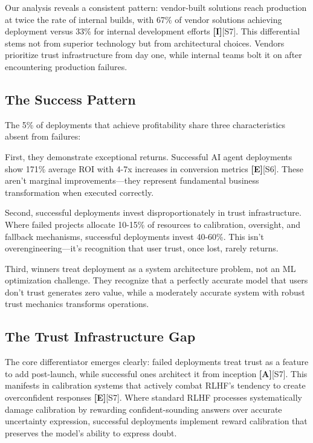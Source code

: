\documentclass[a4paper,11pt]{article}
\newcommand{\elabel}{\textbf{\textcolor{ecolor}{[E]}}}
\newcommand{\ilabel}{\textbf{\textcolor{icolor}{[I]}}}
\newcommand{\alabel}{\textbf{\textcolor{acolor}{[A]}}}
\begin{document}
Our analysis reveals a consistent pattern: vendor-built solutions reach production at twice the rate of internal builds, with 67\% of vendor solutions achieving deployment versus 33\% for internal development efforts \ilabel{}\textcolor{primary}{[S7]}. This differential stems not from superior technology but from architectural choices. Vendors prioritize trust infrastructure from day one, while internal teams bolt it on after encountering production failures.


\subsection{The Success Pattern}

The 5\% of deployments that achieve profitability share three characteristics absent from failures:


First, they demonstrate exceptional returns. Successful AI agent deployments show 171\% average ROI with 4-7x increases in conversion metrics \elabel{}\textcolor{primary}{[S6]}. These aren't marginal improvements—they represent fundamental business transformation when executed correctly.


Second, successful deployments invest disproportionately in trust infrastructure. Where failed projects allocate 10-15\% of resources to calibration, oversight, and fallback mechanisms, successful deployments invest 40-60\%. This isn't overengineering—it's recognition that user trust, once lost, rarely returns.


Third, winners treat deployment as a system architecture problem, not an ML optimization challenge. They recognize that a perfectly accurate model that users don't trust generates zero value, while a moderately accurate system with robust trust mechanics transforms operations.


\subsection{The Trust Infrastructure Gap}

The core differentiator emerges clearly: failed deployments treat trust as a feature to add post-launch, while successful ones architect it from inception \alabel{}\textcolor{primary}{[S7]}. This manifests in calibration systems that actively combat RLHF's tendency to create overconfident responses \elabel{}\textcolor{primary}{[S7]}. Where standard RLHF processes systematically damage calibration by rewarding confident-sounding answers over accurate uncertainty expression, successful deployments implement reward calibration that preserves the model's ability to express doubt.
\end{document}

